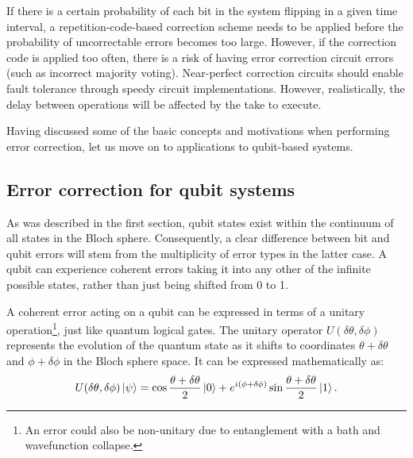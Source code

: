 If there is a certain probability of each bit in the system flipping in a given time interval, a repetition-code-based correction scheme needs to be applied before the probability of uncorrectable errors becomes too large. However, if the correction code is applied too often, there is a risk of having error correction circuit errors (such as incorrect majority voting). Near-perfect correction circuits should enable fault tolerance through speedy circuit implementations. However, realistically, the delay between operations will be affected by the take to execute.

Having discussed some of the basic concepts and motivations when performing error correction, let us move on to applications to qubit-based systems.


\subsection{Error correction for qubit systems}

As was described in the first section, qubit states exist within the continuum of all states in the Bloch sphere. Consequently, a clear difference between bit and qubit errors will stem from the multiplicity of error types in the latter case. A qubit can experience coherent errors taking it into any other of the infinite possible states, rather than just being shifted from 0 to 1.

A coherent error acting on a qubit can be expressed in terms of a unitary operation\footnote{An error could also be non-unitary due to entanglement with a bath and wavefunction collapse.}, just like quantum logical gates. The unitary operator $U(\delta\theta,\delta\phi)$ represents the evolution of the quantum state as it shifts to coordinates $\theta+\delta\theta$ and $\phi+\delta\phi$ in the Bloch sphere space. It can be expressed mathematically as:
\begin{equation}
    U(\delta\theta,\delta\phi)\ket{\psi} = \cos\frac{\theta+\delta\theta}{2}\ket{0}+e^{i(\phi+\delta\phi)}\sin\frac{\theta+\delta\theta}{2}\ket{1}.
\end{equation}

